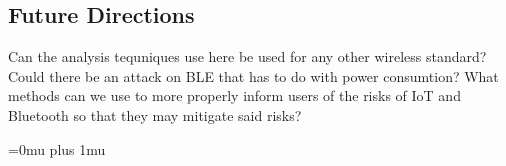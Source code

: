 \documentclass[letterpaper,12pt]{article}
\begin{document}
\subsection{Future Directions}

\noindent
Can the analysis tequniques use here be used for any other wireless standard? Could there be an attack on BLE that has to do with power consumtion? What methods can we use to more properly inform users of the risks of IoT and Bluetooth so that they may mitigate said risks?

\Urlmuskip=0mu plus 1mu\relax


\pagebreak


\end{document}
